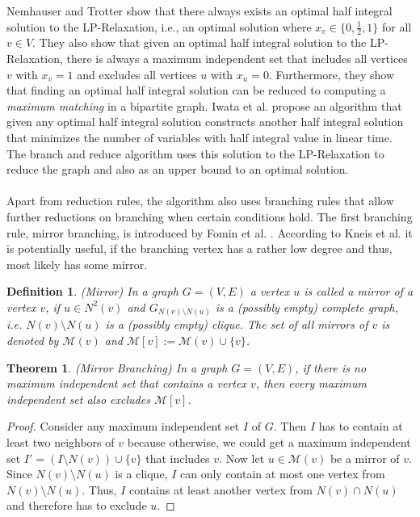 \documentclass[12pt,a4paper,twoside]{scrartcl}
\newtheorem{theorem}{Theorem}
\newtheorem{definition}{Definition}
\numberwithin{equation}{section}
\begin{document}
Nemhauser and Trotter \cite{NemhauserTrotter} show that there always exists an optimal half integral solution to the LP-Relaxation, i.e., an optimal solution where $x_v\in\{0,\frac{1}{2},1\}$ for all $v\in V$. They also show that given an optimal half integral solution to the LP-Relaxation, there is always a maximum independent set that includes all vertices $v$ with $x_v=1$ and excludes all vertices $u$ with $x_u = 0$. Furthermore, they show that finding an optimal half integral solution can be reduced to computing a \textit{maximum matching} in a bipartite graph. Iwata et al. \cite{IwataOkaYoshida} propose an algorithm that given any optimal half integral solution constructs another half integral solution that minimizes the number of variables with half integral value in linear time. The branch and reduce algorithm uses this solution to the LP-Relaxation to reduce the graph and also as an upper bound to an optimal solution.\paragraph{}
Apart from reduction rules, the algorithm also uses branching rules that allow further reductions on branching when certain conditions hold. The first branching rule, mirror branching, is introduced by Fomin et al. \cite{Fomin}. According to Kneis et al. \cite{Kneis} it is potentially useful, if the branching vertex has a rather low degree and thus, most likely has some mirror.

\begin{definition} (Mirror)
	In a graph $G=(V,E)$ a vertex $u$ is called a mirror of a vertex $v$, if $u\in N^2(v)$ and $G_{N(v)\setminus N(u)}$ is a (possibly empty) complete graph, i.e. $N(v)\setminus N(u)$ is a (possibly empty) clique. The set of all mirrors of $v$ is denoted by $\mathcal{M}(v)$ and $\mathcal{M}[v] := \mathcal{M}(v)\cup\{v\}$.
\end{definition} 
\begin{theorem} (Mirror Branching)
	In a graph $G=(V,E)$, if there is no maximum independent set that contains a vertex $v$, then every maximum independent set also excludes $\mathcal{M}[v]$.
\end{theorem}
\begin{proof}
	Consider any maximum independent set $I$ of $G$. Then $I$ has to contain at least two neighbors of $v$ because otherwise, we could get a maximum independent set $I'=(I\setminus N(v))\cup\{v\}$ that includes $v$. Now let $u\in\mathcal{M}(v)$ be a mirror of $v$. Since $N(v)\setminus N(u)$ is a clique, $I$ can only contain at most one vertex from $N(v)\setminus N(u)$. Thus, $I$ contains at least another vertex from $N(v)\cap N(u)$ and therefore has to exclude $u$.
\end{proof}
\end{document}

